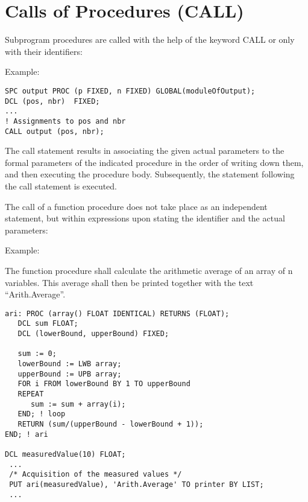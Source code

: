 \section{Calls of Procedures (CALL)}   %
\label{sec_call}

Subprogram procedures are called with the help of the keyword CALL or
only with their identifiers:

\begin{grammarframe} 

\end{grammarframe} 

Example:

\begin{lstlisting}
SPC output PROC (p FIXED, n FIXED) GLOBAL(moduleOfOutput);
DCL (pos, nbr)  FIXED;
...
! Assignments to pos and nbr
CALL output (pos, nbr);
\end{lstlisting}

The call statement results in associating the given actual parameters
to the formal parameters of the indicated procedure in the order of
writing down them, and then executing the procedure body. Subsequently,
the statement following the call statement is executed.

The call of a function procedure does not take place as an independent
statement, but within expressions upon stating the identifier and the
actual parameters:

\begin{grammarframe}
\end{grammarframe}

Example:

The function procedure  shall calculate the arithmetic average of an
array of n  variables. This average shall then be printed together
with the text ``Arith.Average''.

\begin{lstlisting}
ari: PROC (array() FLOAT IDENTICAL) RETURNS (FLOAT);
   DCL sum FLOAT;
   DCL (lowerBound, upperBound) FIXED;

   sum := 0;
   lowerBound := LWB array; 
   upperBound := UPB array; 
   FOR i FROM lowerBound BY 1 TO upperBound
   REPEAT
      sum := sum + array(i);
   END; ! loop
   RETURN (sum/(upperBound - lowerBound + 1));
END; ! ari

DCL measuredValue(10) FLOAT;
 ...
 /* Acquisition of the measured values */ 
 PUT ari(measuredValue), 'Arith.Average' TO printer BY LIST;
 ...
\end{lstlisting}

